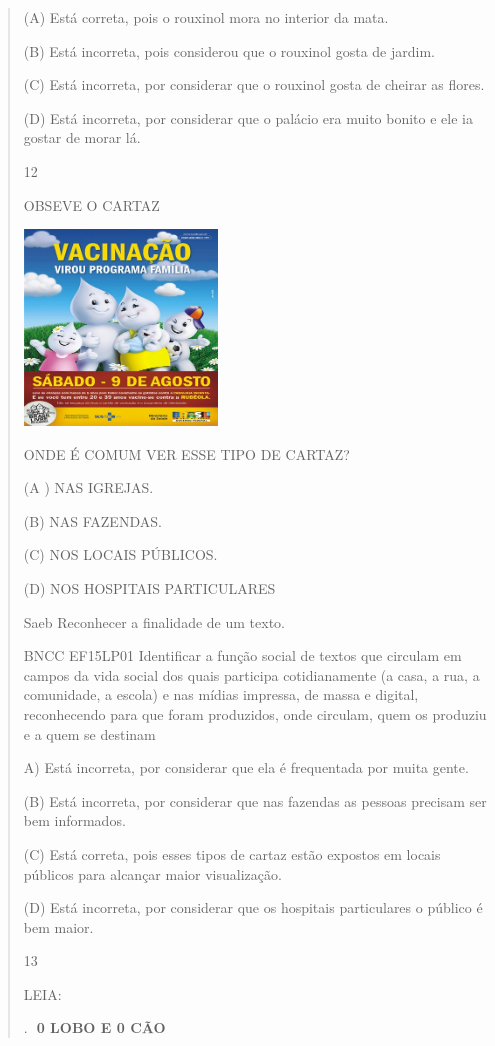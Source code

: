 \begin{verse}
{{{{{{{{{{{{{{{{{{{{(A) Está correta, pois o rouxinol mora no interior da mata.

(B) Está incorreta, pois considerou que o rouxinol gosta de jardim.

(C) Está incorreta, por considerar que o rouxinol gosta de cheirar as
flores.

(D) Está incorreta, por considerar que o palácio era muito bonito e ele
ia gostar de morar lá.

\num{12}

OBSEVE O CARTAZ

\includegraphics[width=2.01806in,height=2.05069in]{media/image159.jpeg}

ONDE É COMUM VER ESSE TIPO DE CARTAZ?

(A ) NAS IGREJAS.

(B) NAS FAZENDAS.

(C) NOS LOCAIS PÚBLICOS.

(D) NOS HOSPITAIS PARTICULARES

Saeb Reconhecer a finalidade de um texto.

BNCC EF15LP01 Identificar a função social de textos que circulam em
campos da vida social dos quais participa cotidianamente (a casa, a rua,
a comunidade, a escola) e nas mídias impressa, de massa e digital,
reconhecendo para que foram produzidos, onde circulam, quem os produziu
e a quem se destinam

A) Está incorreta, por considerar que ela é frequentada por muita gente.

(B) Está incorreta, por considerar que nas fazendas as pessoas precisam
ser bem informados.

(C) Está correta, pois esses tipos de cartaz estão expostos em locais
públicos para alcançar maior visualização.

(D) Está incorreta, por considerar que os hospitais particulares o
público é bem maior.

\num{13}

LEIA:

.~\includegraphics{media/image160.png}\includegraphics{media/image160.png}\textbf{0
LOBO E 0 CÃO}

}}}}}}}}}}}}}}}}}}}}
\end{verse}
